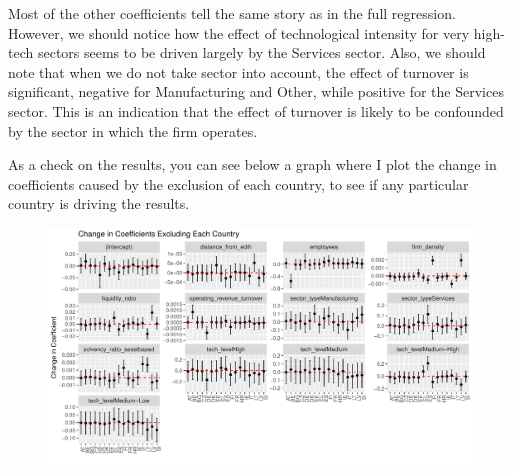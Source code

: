 \documentclass[12pt]{report}
\begin{document}
\par Most of the other coefficients tell the same story as in the full regression. However, we should notice how the effect of technological intensity for very high-tech sectors seems to be driven largely by the Services sector. Also, we should note that when we do not take sector into account, the effect of turnover is significant, negative for Manufacturing and Other, while positive for the Services sector. This is an indication that the effect of turnover is likely to be confounded by the sector in which the firm operates.

\par As a check on the results, you can see below a graph where I plot the change in coefficients caused by the exclusion of each country, to see if any particular country is driving the results.


\clearpage %

\begin{figure}
    \centering
    \includegraphics[width=\textwidth]{../Output/changes-in-coeff-nocountryeffects-LEGACY.pdf}
    \caption{}
    \label{fig:changes_in_coeff-nocountryeffects-BIGFORMAT}
\end{figure}
\end{document}
